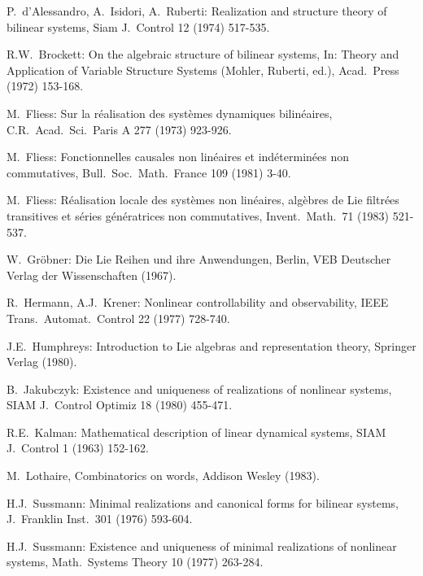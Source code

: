 \documentclass[a4paper,12pt]{article}
\begin{document}
\begin{thebibliography}{99}
	P.~{d'Alessandro}, A.~Isidori, A.~Ruberti:
	Realization and structure theory of bilinear systems,
	Siam J.~Control 12 (1974) 517-535.
	
	R.W.~{Brockett}:
	On the algebraic structure of bilinear systems, 
	In: Theory and Application of Variable Structure Systems (Mohler, Ruberti, ed.), Acad.~Press (1972) 153-168.
	
	M.~Fliess:
	Sur la réalisation des systèmes dynamiques bilinéaires, 
	C.R.\ Acad.\ Sci.\ Paris A 277 (1973) 923-926.
	
	M.~Fliess:
	Fonctionnelles causales non linéaires et indéterminées non commutatives,
	Bull.~Soc.~Math.~France 109 (1981) 3-40.
	
	M.~Fliess:
	Réalisation locale des systèmes non linéaires, algèbres de Lie filtrées transitives et séries génératrices non commutatives,
	Invent.\ Math.\ 71 (1983) 521-537.
	
	W.~Gröbner: 
	Die Lie Reihen und ihre Anwendungen, 
	Berlin, VEB Deutscher Verlag der Wissenschaften (1967).
	
	R.~Hermann, A.J.~Krener: 
	Nonlinear controllability and observability,
	IEEE Trans.\ Automat.\ Control 22 (1977) 728-740.
	
	J.E.\ Humphreys:
	Introduction to Lie algebras and representation theory,
	Springer Verlag (1980).
	
	B.~Jakubczyk:
	Existence and uniqueness of realizations of nonlinear systems,
	SIAM J.\ Control Optimiz 18 (1980) 455-471.
	
	R.E.~Kalman: Mathematical description of linear dynamical systems,
	SIAM J.\ Control 1 (1963) 152-162.
	
	M.\ Lothaire,
	Combinatorics on words,
	Addison Wesley (1983).
	
	H.J.\ Sussmann:
	Minimal realizations and canonical forms for bilinear systems,
	J.\ Franklin Inst.\ 301 (1976) 593-604.
	
	H.J.\ Sussmann:
	Existence and uniqueness of minimal realizations of nonlinear systems,
	Math.\ Systems Theory 10 (1977) 263-284.
\end{thebibliography}
\end{document}
